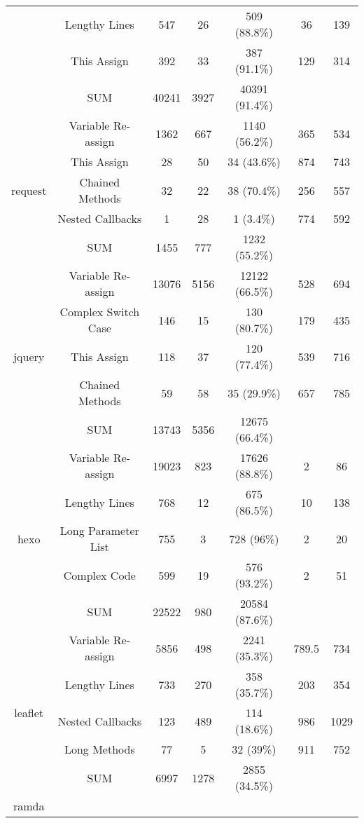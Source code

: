 {\begin{table*}[!htbp]
\begin{tabular}{c|c|c|c|c|c|c}
		& Lengthy Lines & 547 & 26 & 509 (88.8\%) & 36 & 139 \\ \cline{2-7}
		& This Assign & 392 & 33 & 387 (91.1\%) & 129 & 314 \\ \cline{2-7}
		& SUM & 40241 & 3927 & 40391 (91.4\%) & & \\ \hline
		\multirow{5}{*}{request}
		& Variable Re-assign & 1362 & 667 & 1140 (56.2\%) & 365 & 534 \\ \cline{2-7}
		& This Assign & 28 & 50 & 34 (43.6\%) & 874 & 743 \\ \cline{2-7}
		& Chained Methods & 32 & 22 & 38 (70.4\%) & 256 & 557 \\ \cline{2-7}
		& Nested Callbacks & 1 & 28 & 1 (3.4\%) & 774 & 592 \\ \cline{2-7}
		& SUM & 1455 & 777 & 1232 (55.2\%) & & \\ \hline
		\multirow{5}{*}{jquery}
		& Variable Re-assign & 13076 & 5156 & 12122 (66.5\%) & 528 & 694 \\ \cline{2-7}
		& Complex Switch Case & 146 & 15 & 130 (80.7\%) & 179 & 435 \\ \cline{2-7}
		& This Assign & 118 & 37 & 120 (77.4\%) & 539 & 716 \\ \cline{2-7}
		& Chained Methods & 59 & 58 & 35 (29.9\%) & 657 & 785 \\ \cline{2-7}
		& SUM & 13743 & 5356 & 12675 (66.4\%) & & \\ \hline
		\multirow{5}{*}{hexo}
		& Variable Re-assign & 19023 & 823 & 17626 (88.8\%) & 2 & 86 \\ \cline{2-7}
		& Lengthy Lines & 768 & 12 & 675 (86.5\%) & 10 & 138 \\ \cline{2-7}
		& Long Parameter List & 755 & 3 & 728 (96\%) & 2 & 20 \\ \cline{2-7}
		& Complex Code & 599 & 19 & 576 (93.2\%) & 2 & 51 \\ \cline{2-7}
		& SUM & 22522 & 980 & 20584 (87.6\%) & & \\ \hline
		\multirow{5}{*}{leaflet}
		& Variable Re-assign & 5856 & 498 & 2241 (35.3\%) & 789.5 & 734 \\ \cline{2-7}
		& Lengthy Lines & 733 & 270 & 358 (35.7\%) & 203 & 354 \\ \cline{2-7}
		& Nested Callbacks & 123 & 489 & 114 (18.6\%) & 986 & 1029 \\ \cline{2-7}
		& Long Methods & 77 & 5 & 32 (39\%) & 911 & 752 \\ \cline{2-7}
		& SUM & 6997 & 1278 & 2855 (34.5\%) & & \\ \hline
		\multirow{5}{*}{ramda}

\end{tabular}
\end{table*}}
